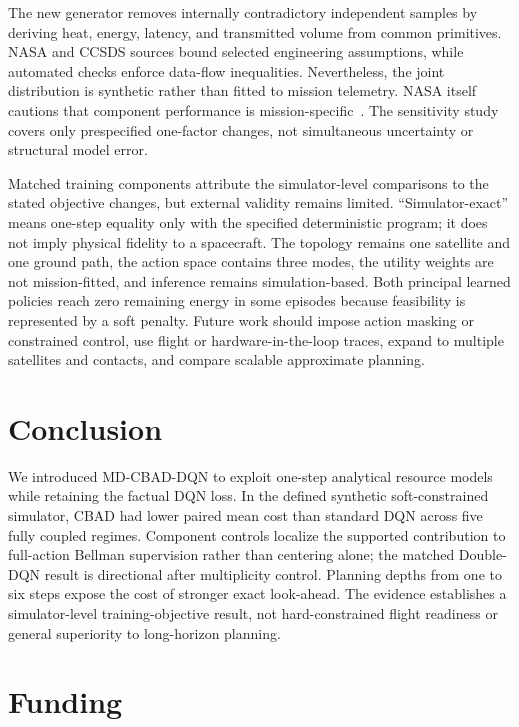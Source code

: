 \documentclass[11pt]{article}
\newcommand{\method}{MD-CBAD-DQN\xspace}
\begin{document}
The new generator removes internally contradictory independent samples by deriving heat, energy, latency, and transmitted volume from common primitives. NASA and CCSDS sources bound selected engineering assumptions, while automated checks enforce data-flow inequalities. Nevertheless, the joint distribution is synthetic rather than fitted to mission telemetry. NASA itself cautions that component performance is mission-specific~\cite{nasa2026soa}. The sensitivity study covers only prespecified one-factor changes, not simultaneous uncertainty or structural model error.

{\color{red}%
Matched training components attribute the simulator-level comparisons to the stated objective changes, but external validity remains limited. ``Simulator-exact'' means one-step equality only with the specified deterministic program; it does not imply physical fidelity to a spacecraft. The topology remains one satellite and one ground path, the action space contains three modes, the utility weights are not mission-fitted, and inference remains simulation-based. Both principal learned policies reach zero remaining energy in some episodes because feasibility is represented by a soft penalty. Future work should impose action masking or constrained control, use flight or hardware-in-the-loop traces, expand to multiple satellites and contacts, and compare scalable approximate planning.
}%

\section{Conclusion}

{\color{red}%
We introduced \method to exploit one-step analytical resource models while retaining the factual DQN loss. In the defined synthetic soft-constrained simulator, CBAD had lower paired mean cost than standard DQN across five fully coupled regimes. Component controls localize the supported contribution to full-action Bellman supervision rather than centering alone; the matched Double-DQN result is directional after multiplicity control. Planning depths from one to six steps expose the cost of stronger exact look-ahead. The evidence establishes a simulator-level training-objective result, not hard-constrained flight readiness or general superiority to long-horizon planning.
}%

\section*{Funding}
\end{document}

